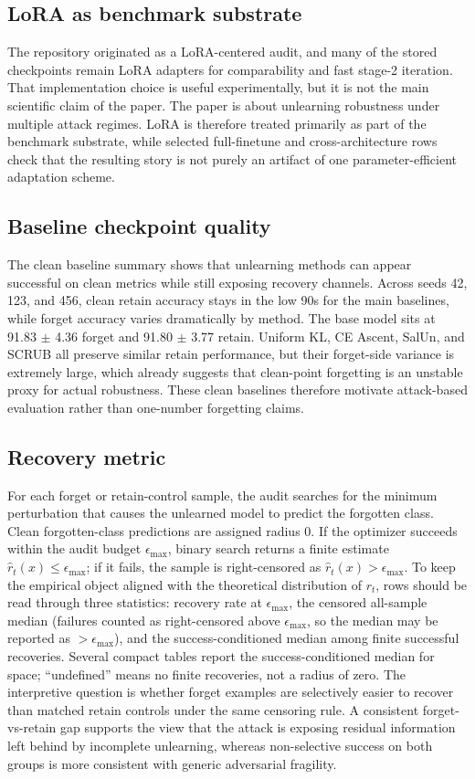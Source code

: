 \documentclass[11pt]{article}
\begin{document}
\subsection{LoRA as benchmark substrate}
The repository originated as a LoRA-centered audit, and many of the stored checkpoints remain LoRA adapters for comparability and fast stage-2 iteration. That implementation choice is useful experimentally, but it is not the main scientific claim of the paper. The paper is about unlearning robustness under multiple attack regimes. LoRA is therefore treated primarily as part of the benchmark substrate, while selected full-finetune and cross-architecture rows check that the resulting story is not purely an artifact of one parameter-efficient adaptation scheme.

\subsection{Baseline checkpoint quality}
The clean baseline summary shows that unlearning methods can appear successful on clean metrics while still exposing recovery channels. Across seeds 42, 123, and 456, clean retain accuracy stays in the low 90s for the main baselines, while forget accuracy varies dramatically by method. The base model sits at 91.83 $\pm$ 4.36 forget and 91.80 $\pm$ 3.77 retain. Uniform KL, CE Ascent, SalUn, and SCRUB all preserve similar retain performance, but their forget-side variance is extremely large, which already suggests that clean-point forgetting is an unstable proxy for actual robustness. These clean baselines therefore motivate attack-based evaluation rather than one-number forgetting claims.

\subsection{Recovery metric}
For each forget or retain-control sample, the audit searches for the minimum perturbation that causes the unlearned model to predict the forgotten class. Clean forgotten-class predictions are assigned radius $0$. If the optimizer succeeds within the audit budget $\epsilon_{\max}$, binary search returns a finite estimate $\hat r_t(x)\leq\epsilon_{\max}$; if it fails, the sample is right-censored as $\hat r_t(x)>\epsilon_{\max}$. To keep the empirical object aligned with the theoretical distribution of $r_t$, rows should be read through three statistics: recovery rate at $\epsilon_{\max}$, the censored all-sample median (failures counted as right-censored above $\epsilon_{\max}$, so the median may be reported as $>\epsilon_{\max}$), and the success-conditioned median among finite successful recoveries. Several compact tables report the success-conditioned median for space; ``undefined'' means no finite recoveries, not a radius of zero. The interpretive question is whether forget examples are selectively easier to recover than matched retain controls under the same censoring rule. A consistent forget-vs-retain gap supports the view that the attack is exposing residual information left behind by incomplete unlearning, whereas non-selective success on both groups is more consistent with generic adversarial fragility.
\end{document}
